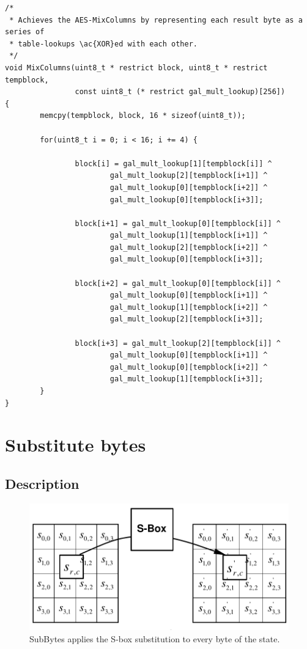 \begin{lstlisting}
/*
 * Achieves the AES-MixColumns by representing each result byte as a series of
 * table-lookups \ac{XOR}ed with each other.
 */
void MixColumns(uint8_t * restrict block, uint8_t * restrict tempblock,
                const uint8_t (* restrict gal_mult_lookup)[256])
{
        memcpy(tempblock, block, 16 * sizeof(uint8_t));

        for(uint8_t i = 0; i < 16; i += 4) {

                block[i] = gal_mult_lookup[1][tempblock[i]] ^
                        gal_mult_lookup[2][tempblock[i+1]] ^
                        gal_mult_lookup[0][tempblock[i+2]] ^
                        gal_mult_lookup[0][tempblock[i+3]];

                block[i+1] = gal_mult_lookup[0][tempblock[i]] ^
                        gal_mult_lookup[1][tempblock[i+1]] ^
                        gal_mult_lookup[2][tempblock[i+2]] ^
                        gal_mult_lookup[0][tempblock[i+3]];

                block[i+2] = gal_mult_lookup[0][tempblock[i]] ^
                        gal_mult_lookup[0][tempblock[i+1]] ^
                        gal_mult_lookup[1][tempblock[i+2]] ^
                        gal_mult_lookup[2][tempblock[i+3]];

                block[i+3] = gal_mult_lookup[2][tempblock[i]] ^
                        gal_mult_lookup[0][tempblock[i+1]] ^
                        gal_mult_lookup[0][tempblock[i+2]] ^
                        gal_mult_lookup[1][tempblock[i+3]];
        }
}
\end{lstlisting}



\hypertarget{substitute-bytes}{%
\section{Substitute bytes}\label{substitute-bytes}}

\hypertarget{description-5}{%
\subsection{Description}\label{description-5}}

\begin{figure}
\centering
\includegraphics[scale = 0.3]{data/figures/subbytes.png}
\caption{SubBytes applies the S-box substitution to every byte of the
state. \cite[ch. 5.1.1.]{aes2001}}
\end{figure}

